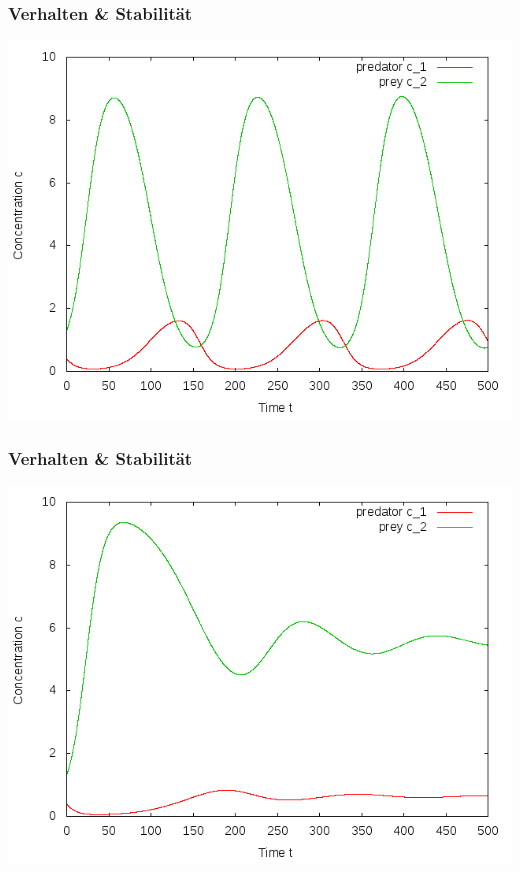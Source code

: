 \documentclass[12pt]{beamer}
\begin{document}
    \begin{frame}
    \frametitle{Verhalten \& Stabilität}
    \includegraphics[scale=0.5]{Bilder/n2_unged_schwingungen.png}
    \end{frame}
    
    \begin{frame}
    \frametitle{Verhalten \& Stabilität}
    \includegraphics[scale=0.5]{Bilder/n2_ged_schwingungen.png}
    \end{frame}
    
\end{document}
